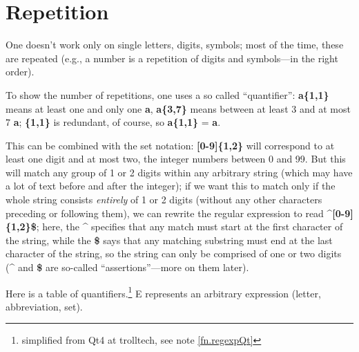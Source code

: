 \section{Repetition}

One doesn't work only on single letters, digits, symbols; most of the time, these are repeated (e.g., a number is a repetition of digits and symbols---in the right order).

To show the number of  repetitions, one uses a so called ``quantifier'': \textbf{a\{1,1\}} means at least one and only one \textbf{a}, \textbf{a\{3,7\}} means between at least 3 and at most 7 \textbf{a}; \textbf{\{1,1\}} is redundant, of course, so \textbf{a\{1,1\}} = \textbf{a}.

This can be combined with the set notation: \textbf{[0-9]\{1,2\}} will correspond to at least one digit and at most two, the integer numbers between 0 and 99. But this will match any group of 1 or 2 digits within any arbitrary string (which may have a lot of text before and after the integer); if we want this to match only if the whole string consists \emph{entirely} of 1 or 2 digits (without any other characters preceding or following them), we can rewrite the regular expression to read \textbf{\^{}[0-9]\{1,2\}\$}; here, the \textbf{\^{}} specifies that any match must start at the first character of the string, while the \textbf{\$} says that any matching substring must end at the last character of the string, so the string can only be comprised of one or two digits (\textbf{\^{}} and \textbf{\$} are so-called ``assertions''---more on them later).

Here is a table of quantifiers.\footnote{simplified from Qt4 at trolltech, see note \ref{fn.regexpQt}} E represents an arbitrary expression (letter, abbreviation, set).
\smallskip

